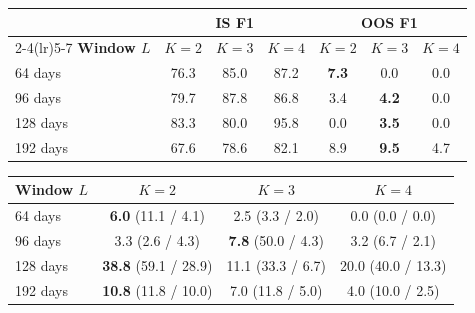 \documentclass[]{interact}
\begin{document}
\begin{table}[htbp]

{\renewcommand{\arraystretch}{1.25}
\setlength{\tabcolsep}{8pt}
\begin{tabular}{lcccccc}
\toprule
 & \multicolumn{3}{c}{\textbf{IS F1}} & \multicolumn{3}{c}{\textbf{OOS F1}} \\
\cmidrule(lr){2-4}\cmidrule(lr){5-7}
\textbf{Window $L$} & $K=2$ & $K=3$ & $K=4$ & $K=2$ & $K=3$ & $K=4$ \\
\midrule
64 days  & 76.3 & 85.0 & 87.2 & \textbf{7.3} & 0.0 & 0.0 \\
96 days  & 79.7 & 87.8 & 86.8 & 3.4 & \textbf{4.2} & 0.0 \\
128 days & 83.3 & 80.0 & 95.8 & 0.0 & \textbf{3.5} & 0.0 \\
192 days & 67.6 & 78.6 & 82.1 & 8.9 & \textbf{9.5} & 4.7 \\
\bottomrule
\end{tabular}}
\label{tab:sensitivity}
\vspace{7pt}
{\renewcommand{\arraystretch}{1.25}
\setlength{\tabcolsep}{8pt}
\begin{tabular}{lccc}
\toprule
\textbf{Window $L$} & $K=2$ & $K=3$ & $K=4$ \\
\midrule
64 days  & \textbf{6.0} (11.1 / 4.1) & 2.5 (3.3 / 2.0) & 0.0 (0.0 / 0.0) \\
96 days  & 3.3 (2.6 / 4.3) & \textbf{7.8} (50.0 / 4.3) & 3.2 (6.7 / 2.1) \\
128 days & \textbf{38.8} (59.1 / 28.9) & 11.1 (33.3 / 6.7) & 20.0 (40.0 / 13.3) \\
192 days & \textbf{10.8} (11.8 / 10.0) & 7.0 (11.8 / 5.0) & 4.0 (10.0 / 2.5) \\
\bottomrule
\end{tabular}}
\label{tab:sensitivity_ens}

\end{table}
\end{document}
